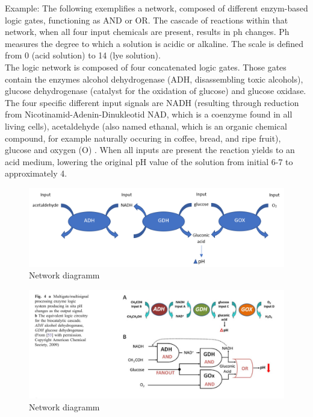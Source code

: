 \documentclass[runningheads]{llncs}
\begin{document}
		Example: The following exemplifies a network, composed of different enzym-based logic gates, functioning as AND or OR. The cascade of reactions within that network, when all four input chemicals are present, results in ph changes. Ph measures the degree to which a solution is acidic or alkaline. The scale is defined from 0 (acid solution) to 14 (lye solution).\\
		The logic network is composed of four concatenated logic gates. Those gates contain the enzymes alcohol dehydrogenase (ADH, disassembling toxic alcohols), glucose dehydrogenase (catalyst for the oxidation of glucose) and glucose oxidase. The four specific different input signals are NADH (resulting through reduction from Nicotinamid-Adenin-Dinukleotid NAD, which is a coenzyme found in all living cells),  acetaldehyde (also named ethanal, which is an organic chemical compound, for example naturally occuring in coffee, bread, and ripe fruit), glucose and oxygen (O) .
	 	When all inputs are present the reaction yields to an acid medium, lowering the original pH value of the solution from initial 6-7 to approximately 4. \cite{original}\cite{chemie}
	\begin{center}
		\begin{figure}[H] \centering \includegraphics[scale= 0.38]{pics/network1.png} \caption{Network diagramm} \label{img:grafik-test} \end{figure}
	\end{center}	

		\begin{figure}[H] \centering \includegraphics[scale= 0.3]{pics/biocomputing_sensor.png} \caption{Network diagramm} \label{img:grafik-test} \end{figure}
	
\end{document}
